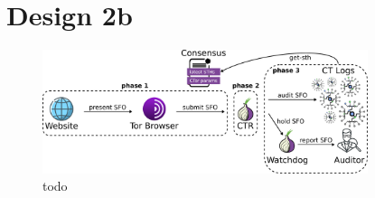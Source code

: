 \section{Design 2b} \label{sec:design-log}

%
%

%
%

%

%
%
%
%

%
%

%
%


\begin{figure}
    \centering
    \includegraphics[width=0.85\textwidth]{img/design-auditor}
    \caption{todo}
    \label{fig:design-auditor}
\end{figure}
